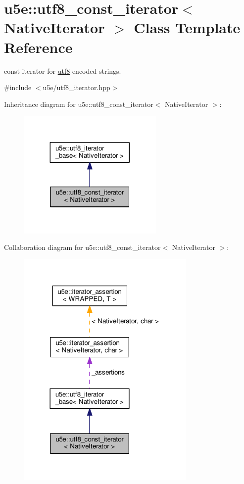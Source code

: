\hypertarget{classu5e_1_1utf8__const__iterator}{}\section{u5e\+:\+:utf8\+\_\+const\+\_\+iterator$<$ Native\+Iterator $>$ Class Template Reference}
\label{classu5e_1_1utf8__const__iterator}


const iterator for \hyperlink{classu5e_1_1utf8}{utf8} encoded strings.  




{\ttfamily \#include $<$u5e/utf8\+\_\+iterator.\+hpp$>$}



Inheritance diagram for u5e\+:\+:utf8\+\_\+const\+\_\+iterator$<$ Native\+Iterator $>$\+:
\nopagebreak
\begin{figure}[H]
\begin{center}
\leavevmode
\includegraphics[width=200pt]{classu5e_1_1utf8__const__iterator__inherit__graph}
\end{center}
\end{figure}


Collaboration diagram for u5e\+:\+:utf8\+\_\+const\+\_\+iterator$<$ Native\+Iterator $>$\+:
\nopagebreak
\begin{figure}[H]
\begin{center}
\leavevmode
\includegraphics[width=246pt]{classu5e_1_1utf8__const__iterator__coll__graph}
\end{center}
\end{figure}

